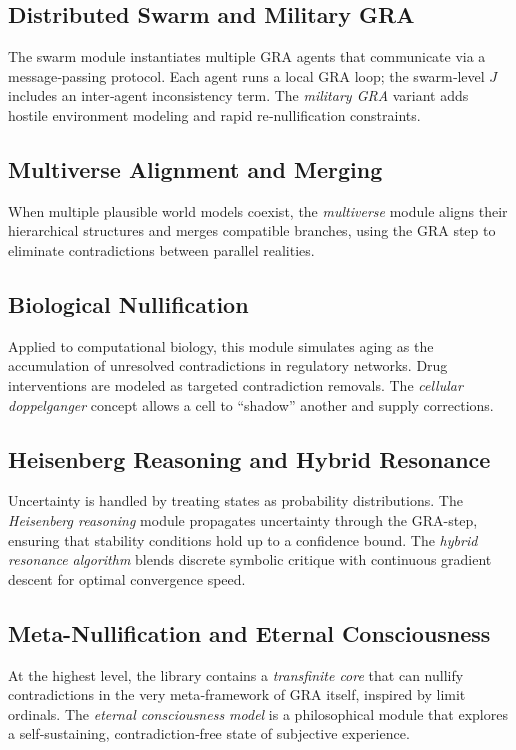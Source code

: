 \documentclass[11pt,a4paper]{article}
\begin{document}
\subsection{Distributed Swarm and Military GRA}
The swarm module instantiates multiple GRA agents that communicate via a message‑passing protocol. Each agent runs a local GRA loop; the swarm‑level $J$ includes an inter‑agent inconsistency term. The \textit{military GRA} variant adds hostile environment modeling and rapid re‑nullification constraints.

\subsection{Multiverse Alignment and Merging}
When multiple plausible world models coexist, the \textit{multiverse} module aligns their hierarchical structures and merges compatible branches, using the GRA step to eliminate contradictions between parallel realities.

\subsection{Biological Nullification}
Applied to computational biology, this module simulates aging as the accumulation of unresolved contradictions in regulatory networks. Drug interventions are modeled as targeted contradiction removals. The \textit{cellular doppelganger} concept allows a cell to “shadow” another and supply corrections.

\subsection{Heisenberg Reasoning and Hybrid Resonance}
Uncertainty is handled by treating states as probability distributions. The \textit{Heisenberg reasoning} module propagates uncertainty through the GRA-step, ensuring that stability conditions hold up to a confidence bound. The \textit{hybrid resonance algorithm} blends discrete symbolic critique with continuous gradient descent for optimal convergence speed.

\subsection{Meta-Nullification and Eternal Consciousness}
At the highest level, the library contains a \textit{transfinite core} that can nullify contradictions in the very meta‑framework of GRA itself, inspired by limit ordinals. The \textit{eternal consciousness model} is a philosophical module that explores a self‑sustaining, contradiction‑free state of subjective experience.
\end{document}
